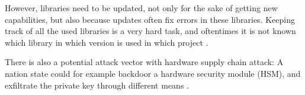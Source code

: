 However, libraries need to be updated, not only for the sake of getting new capabilities,
but also because updates often fix errors in these libraries.
Keeping track of all the used libraries is a very hard task, and oftentimes it is not
known which library in which version is used in which project \cite{Log4Shell21}.

There is also a potential attack vector with hardware supply chain attack:
A nation state could for example backdoor a hardware security module (HSM), 
and exfiltrate the private key through different means \cite{SchneierBackdoor25}.
